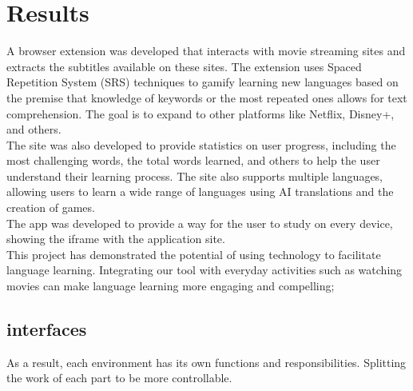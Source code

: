 \documentclass[12pt]{article}
\begin{document}
\section{Results}
A browser extension was developed that interacts with movie streaming sites and extracts the subtitles available on these sites. The extension uses Spaced Repetition System (SRS) techniques to gamify learning new languages based on the premise that knowledge of keywords or the most repeated ones allows for text comprehension. The goal is to expand to other platforms like Netflix, Disney+, and others. \\ 
The site was also developed to provide statistics on user progress, including the most challenging words, the total words learned, and others to help the user understand their learning process. The site also supports multiple languages, allowing users to learn a wide range of languages using AI translations and the creation of games.  \\
The app was developed to provide a way for the user to study on every device, showing the iframe with the application site.\\
This project has demonstrated the potential of using technology to facilitate language learning. Integrating our tool with everyday activities such as watching movies can make language learning more engaging and compelling; 
\subsection{interfaces}
As a result, each environment has its own functions and responsibilities. Splitting the work of each part to be more controllable. 
\end{document}
